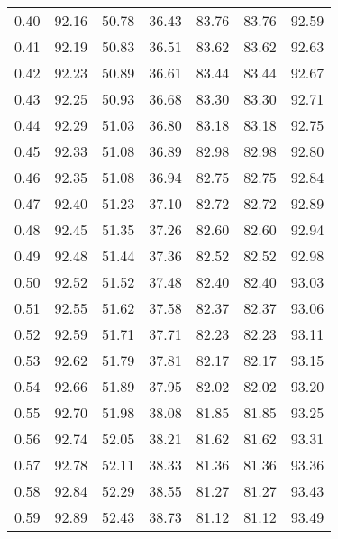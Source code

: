 \begin{tabular}{|c|c|c|c|c|c|c|}
      0.40 &     92.16 &     50.78 &      36.43 &   83.76 &      83.76 &         92.59 \\
      0.41 &     92.19 &     50.83 &      36.51 &   83.62 &      83.62 &         92.63 \\
      0.42 &     92.23 &     50.89 &      36.61 &   83.44 &      83.44 &         92.67 \\
      0.43 &     92.25 &     50.93 &      36.68 &   83.30 &      83.30 &         92.71 \\
      0.44 &     92.29 &     51.03 &      36.80 &   83.18 &      83.18 &         92.75 \\
      0.45 &     92.33 &     51.08 &      36.89 &   82.98 &      82.98 &         92.80 \\
      0.46 &     92.35 &     51.08 &      36.94 &   82.75 &      82.75 &         92.84 \\
      0.47 &     92.40 &     51.23 &      37.10 &   82.72 &      82.72 &         92.89 \\
      0.48 &     92.45 &     51.35 &      37.26 &   82.60 &      82.60 &         92.94 \\
      0.49 &     92.48 &     51.44 &      37.36 &   82.52 &      82.52 &         92.98 \\
      0.50 &     92.52 &     51.52 &      37.48 &   82.40 &      82.40 &         93.03 \\
      0.51 &     92.55 &     51.62 &      37.58 &   82.37 &      82.37 &         93.06 \\
      0.52 &     92.59 &     51.71 &      37.71 &   82.23 &      82.23 &         93.11 \\
      0.53 &     92.62 &     51.79 &      37.81 &   82.17 &      82.17 &         93.15 \\
      0.54 &     92.66 &     51.89 &      37.95 &   82.02 &      82.02 &         93.20 \\
      0.55 &     92.70 &     51.98 &      38.08 &   81.85 &      81.85 &         93.25 \\
      0.56 &     92.74 &     52.05 &      38.21 &   81.62 &      81.62 &         93.31 \\
      0.57 &     92.78 &     52.11 &      38.33 &   81.36 &      81.36 &         93.36 \\
      0.58 &     92.84 &     52.29 &      38.55 &   81.27 &      81.27 &         93.43 \\
      0.59 &     92.89 &     52.43 &      38.73 &   81.12 &      81.12 &         93.49 \\

\end{tabular}
